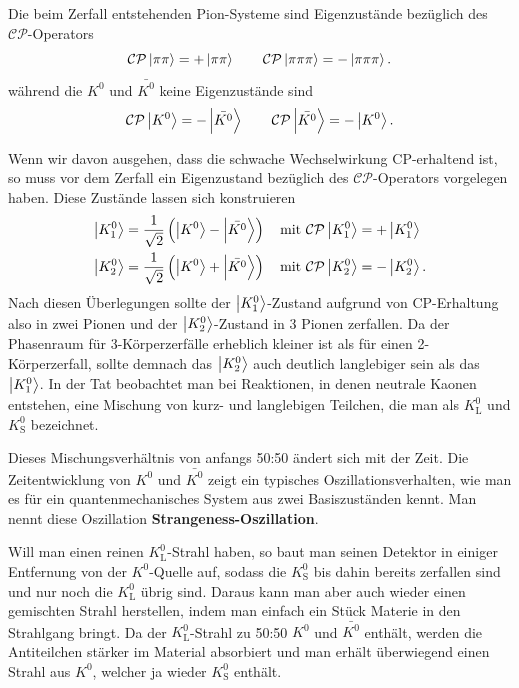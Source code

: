 Die beim Zerfall entstehenden Pion-Systeme sind Eigenzustände bezüglich des $\mathcal{CP}$-Operators
\begin{equation*}
	\mathcal{CP}\ket{\pi\pi} = +\ket{\pi\pi}\qquad\mathcal{CP}\ket{\pi\pi\pi} = -\ket{\pi\pi\pi}.
\end{equation*}
während die $K^0$ und $\bar{K^0}$ keine Eigenzustände sind
\begin{equation*}
	\mathcal{CP}\ket{K^0} = -\ket{\bar{K^0}}\qquad\mathcal{CP}\ket{\bar{K^0}} = -\ket{K^0}.
\end{equation*}

Wenn wir davon ausgehen, dass die schwache Wechselwirkung CP-erhaltend ist, so muss vor dem Zerfall ein Eigenzustand bezüglich des $\mathcal{CP}$-Operators vorgelegen haben.
Diese Zustände lassen sich konstruieren
\begin{align*}
	\ket{K^0_1} &= \frac{1}{\sqrt{2}}\left(\ket{K^0}-\ket{\bar{K^0}}\right) \quad\text{mit}\ \mathcal{CP}\ket{K^0_1} = +\ket{K^0_1} \\
	\ket{K^0_2} &= \frac{1}{\sqrt{2}}\left(\ket{K^0}+\ket{\bar{K^0}}\right) \quad\text{mit}\ \mathcal{CP}\ket{K^0_2} = -\ket{K^0_2}.
\end{align*}
Nach diesen Überlegungen sollte der $\ket{K^0_1}$-Zustand aufgrund von CP-Erhaltung also in zwei Pionen und der $\ket{K^0_2}$-Zustand in 3 Pionen zerfallen.
Da der Phasenraum für 3-Körperzerfälle erheblich kleiner ist als für einen 2-Körperzerfall, sollte demnach das $\ket{K^0_2}$ auch deutlich langlebiger sein als das $\ket{K^0_1}$.
In der Tat beobachtet man bei Reaktionen, in denen neutrale Kaonen entstehen, eine Mischung von kurz- und langlebigen Teilchen, die man als $K^0_\text{L}$ und $K^0_\text{S}$ bezeichnet.

Dieses Mischungsverhältnis von anfangs 50:50 ändert sich mit der Zeit.
Die Zeitentwicklung von $K^0$ und $\bar{K^0}$ zeigt ein typisches Oszillationsverhalten, wie man es für ein quantenmechanisches System aus zwei Basiszuständen kennt.
Man nennt diese Oszillation \textbf{Strangeness-Oszillation}.

Will man einen reinen $K^0_\text{L}$-Strahl haben, so baut man seinen Detektor in einiger Entfernung von der $K^0$-Quelle auf, sodass die $K^0_\text{S}$ bis dahin bereits zerfallen sind und nur noch die $K^0_\text{L}$ übrig sind.
Daraus kann man aber auch wieder einen gemischten Strahl herstellen, indem man einfach ein Stück Materie in den Strahlgang bringt.
Da der $K^0_\text{L}$-Strahl zu 50:50 $K^0$ und $\bar{K^0}$ enthält, werden die Antiteilchen stärker im Material absorbiert und man erhält überwiegend einen Strahl aus $K^0$, welcher ja wieder $K^0_\text{S}$ enthält.

